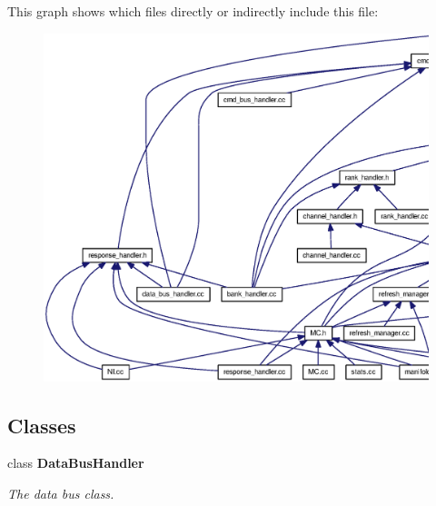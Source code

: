 This graph shows which files directly or indirectly include this file:\nopagebreak
\begin{figure}[H]
\begin{center}
\leavevmode
\includegraphics[width=420pt]{data__bus__handler_8h__dep__incl}
\end{center}
\end{figure}
\subsection*{Classes}
\begin{CompactItemize}
\item 
class {\bf DataBusHandler}
\begin{CompactList}\small\item\em The data bus class. \item\end{CompactList}\end{CompactItemize}
